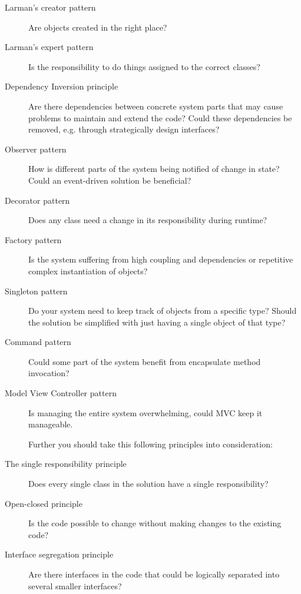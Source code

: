 \documentclass{article}
\begin{document}
    \begin{description}
      \item[Larman’s creator pattern] Are objects created in the right place?

      \item[Larman’s expert pattern] Is the responsibility to do things assigned to the correct classes?
    
      \item[Dependency Inversion principle] Are there dependencies between concrete system parts that may cause problems to maintain and extend the code? Could these dependencies be removed, e.g. through strategically design interfaces?

      \item[Observer pattern] How is different parts of the system being notified of change in state? Could an event-driven solution be beneficial?

      \item[Decorator pattern] Does any class need a change in its responsibility during runtime?

      \item[Factory pattern] Is the system suffering from high coupling and dependencies or repetitive complex instantiation of objects?

      \item[Singleton pattern] Do your system need to keep track of objects from a specific type? Should the solution be simplified with just having a single object of that type?

      \item[Command pattern] Could some part of the system benefit from encapsulate method invocation?

      \item[Model View Controller pattern] Is managing the entire system overwhelming, could MVC keep it manageable.
        
      \item[]
        Further you should take this following principles into consideration:

      \item[The single responsibility principle] Does every single class in the solution have a single responsibility?

      \item[Open-closed principle] Is the code possible to change without making changes to the existing code?

      \item[Interface segregation principle] Are there interfaces in the code that could be logically separated into several smaller interfaces?
    \end{description}
\end{document}
